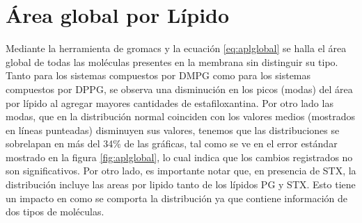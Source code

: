 \section{\'{A}rea global por L\'{i}pido}
Mediante la herramienta de gromacs y la ecuaci\'{o}n \ref{eq:aplglobal} se halla el \'{a}rea global de todas las mol\'{e}culas presentes en la membrana sin distinguir su tipo. Tanto para los sistemas compuestos por DMPG como para los sistemas compuestos por DPPG, se observa una disminuci\'{o}n en los picos (modas) del \'{a}rea por l\'{i}pido al agregar mayores cantidades de estafiloxantina. Por otro lado  las modas, que en la distribuci\'{o}n normal coinciden con los valores medios (mostrados en l\'{i}neas punteadas) disminuyen sus valores, tenemos que las distribuciones se sobrelapan en m\'{a}s del 34\% de las gr\'{a}ficas, tal como se ve en el error est\'{a}ndar mostrado en la figura \ref{fig:aplglobal}, lo cual indica que los cambios registrados no son  significativos. Por otro lado, es importante notar que, en presencia de STX, la distribuci\'{o}n incluye las areas por lipido tanto de los l\'{i}pidos PG y STX. Esto tiene un impacto en como se comporta la distribuci\'{o}n ya que contiene informaci\'{o}n de dos tipos de mol\'{e}culas.\\

